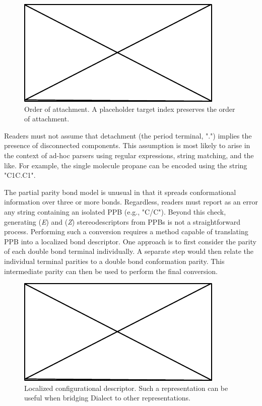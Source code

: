 \documentclass{article}
\begin{document}
\begin{figure}
    \centering
    \includegraphics{filler}
    \caption{Order of attachment. A placeholder target index preserves the order of attachment.}
    \label{fig:order-of-attachment}
\end{figure}

Readers must not assume that detachment (the period terminal, ".") implies the presence of disconnected components. This assumption is most likely to arise in the context of ad-hoc parsers using regular expressions, string matching, and the like. For example, the single molecule propane can be encoded using the string "C1C.C1".

The partial parity bond model is unusual in that it spreads conformational information over three or more bonds. Regardless, readers must report as an error any string containing an isolated PPB (e.g., "C/C"). Beyond this check, generating (\textit{E}) and (\textit{Z}) stereodescriptors from PPBs is not a straightforward process. Performing such a conversion requires a method capable of translating PPB into a localized bond descriptor. One approach is to first consider the parity of each double bond terminal individually. A separate step would then relate the individual terminal parities to a double bond conformation parity. This intermediate parity can then be used to perform the final conversion.

\begin{figure}
    \centering
    \includegraphics{filler}
    \caption{Localized configurational descriptor. Such a representation can be useful when bridging Dialect to other representations.}
    \label{fig:localized-configurational-descriptor}
\end{figure}
\end{document}
